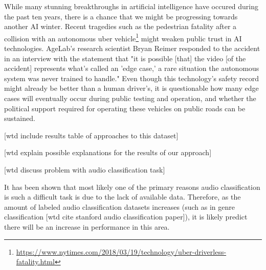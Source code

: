 While many stunning breakthroughs in artificial intelligence have occured during the past ten years, there is a chance that we might be progressing towards another AI winter. Recent tragedies such as the pedestrian fatality after a collision with an autonomous uber vehicle\footnote{\url{https://www.nytimes.com/2018/03/19/technology/uber-driverless-fatality.html}} might weaken public trust in AI technologies. AgeLab's research scientist Bryan Reimer responded to the accident in an interview with the statement that "it is possible [that] the video [of the accident] represents what's called an 'edge case,' a rare situation the autonomous system was never trained to handle." Even though this technology's safety record might already be better than a human driver's, it is questionable how many edge cases will eventually occur during public testing and operation, and whether the political support required for operating these vehicles on public roads can be sustained.

[wtd include results table of approaches to this dataset]

[wtd explain possible explanations for the results of our approach]

[wtd discuss problem with audio classification task]

It has been shown that most likely one of the primary reasons audio classification is such a difficult task is due to the lack of available data.  Therefore, as the amount of labeled audio classification datasets increases (such as in genre classification [wtd cite stanford audio classification paper]), it is likely predict there will be an increase in performance in this area.

